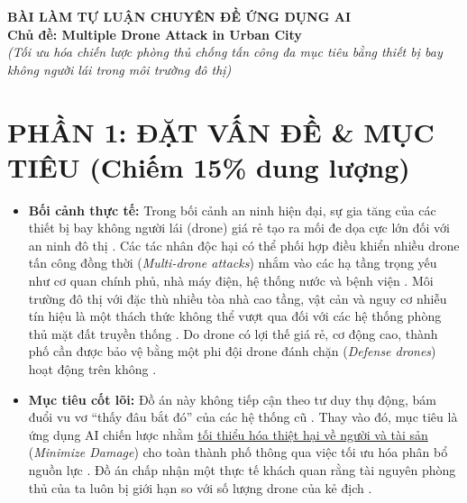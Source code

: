 \documentclass[11pt,a4paper]{article}
\begin{document}

\begin{center}
    \textbf{\LARGE BÀI LÀM TỰ LUẬN CHUYÊN ĐỀ ỨNG DỤNG AI} \\
    \vspace{0.2cm}
    \textbf{\large Chủ đề: Multiple Drone Attack in Urban City} \\
    \textit{(Tối ưu hóa chiến lược phòng thủ chống tấn công đa mục tiêu bằng thiết bị bay không người lái trong môi trường đô thị)}
\end{center}

\vspace{0.5cm}

\section{PHẦN 1: ĐẶT VẤN ĐỀ \& MỤC TIÊU (Chiếm 15\% dung lượng)}

\begin{itemize}
    \item \textbf{Bối cảnh thực tế:} Trong bối cảnh an ninh hiện đại, sự gia tăng của các thiết bị bay không người lái (drone) giá rẻ tạo ra mối đe dọa cực lớn đối với an ninh đô thị \cite{mutzari2025defending}. Các tác nhân độc hại có thể phối hợp điều khiển nhiều drone tấn công đồng thời (\textit{Multi-drone attacks}) nhắm vào các hạ tầng trọng yếu như cơ quan chính phủ, nhà máy điện, hệ thống nước và bệnh viện \cite{mutzari2025defending}. Môi trường đô thị với đặc thù nhiều tòa nhà cao tầng, vật cản và nguy cơ nhiễu tín hiệu là một thách thức không thể vượt qua đối với các hệ thống phòng thủ mặt đất truyền thống \cite{mutzari2025defending}. Do drone có lợi thế giá rẻ, cơ động cao, thành phố cần được bảo vệ bằng một phi đội drone đánh chặn (\textit{Defense drones}) hoạt động trên không \cite{mutzari2025defending}.
    \item \textbf{Mục tiêu cốt lõi:} Đồ án này không tiếp cận theo tư duy thụ động, bám đuổi vu vơ ``thấy đâu bắt đó'' của các hệ thống cũ \cite{mutzari2025defending}. Thay vào đó, mục tiêu là ứng dụng AI chiến lược nhằm \underline{tối thiểu hóa thiệt hại về người và tài sản} (\textit{Minimize Damage}) cho toàn thành phố thông qua việc tối ưu hóa phân bổ nguồn lực \cite{mutzari2025defending}. Đồ án chấp nhận một thực tế khách quan rằng tài nguyên phòng thủ của ta luôn bị giới hạn so với số lượng drone của kẻ địch \cite{mutzari2025defending}.
\end{itemize}
\end{document}
